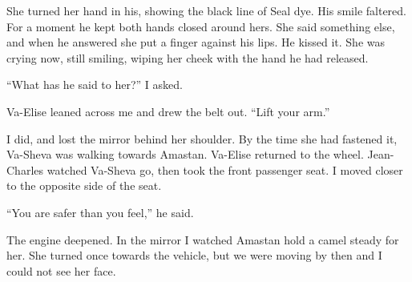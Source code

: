 She turned her hand in his, showing the black line of Seal dye. His smile faltered. For a moment he kept both hands closed around hers. She said something else, and when he answered she put a finger against his lips. He kissed it. She was crying now, still smiling, wiping her cheek with the hand he had released.\par

``What has he said to her?'' I asked.\par

Va-Elise leaned across me and drew the belt out. ``Lift your arm.''\par

I did, and lost the mirror behind her shoulder. By the time she had fastened it, Va-Sheva was walking towards Amastan. Va-Elise returned to the wheel. Jean-Charles watched Va-Sheva go, then took the front passenger seat. I moved closer to the opposite side of the seat.\par

``You are safer than you feel,'' he said.\par

The engine deepened. In the mirror I watched Amastan hold a camel steady for her. She turned once towards the vehicle, but we were moving by then and I could not see her face.\par

